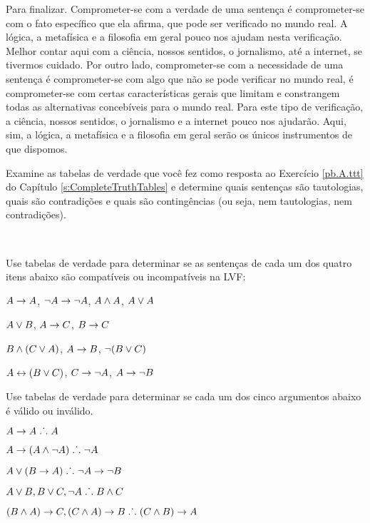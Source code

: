 Para finalizar.
Comprometer-se com a verdade de uma sentença é comprometer-se com o fato específico que ela afirma, que pode ser verificado no mundo real.
A lógica, a metafísica e a filosofia em geral pouco nos ajudam nesta verificação.
Melhor contar aqui com a ciência, nossos sentidos, o jornalismo, até a internet, se tivermos cuidado.
Por outro lado, comprometer-se com a necessidade de uma sentença é comprometer-se com algo que não se pode verificar no mundo real, é comprometer-se com certas características gerais que limitam e constrangem todas as alternativas concebíveis para o mundo real.
Para este tipo de verificação, a ciência, nossos sentidos, o jornalismo e a internet pouco nos ajudarão.
Aqui, sim, a lógica, a metafísica e a filosofia em geral serão os únicos instrumentos de que dispomos.


\practiceproblems
\problempart
Examine as tabelas de verdade que você fez como resposta ao Exercício \ref{pb.A.ttt} do Capítulo \ref{s:CompleteTruthTables} e determine quais sentenças são tautologias, quais são contradições e quais são contingências (ou seja, nem tautologias, nem contradições).
\solutions

\

\problempart
\label{pr.TT.satisfiable}
Use tabelas de verdade para determinar se as sentenças de cada um dos quatro itens abaixo são compatíveis ou incompatíveis na LVF:
\begin{earg}
\item $A\rightarrow A$, $\neg A \rightarrow \neg A$, $A\wedge A$, $A\vee A$ %
\item $A\vee B$, $A\rightarrow C$, $B\rightarrow C$ %
\item $B\wedge(C\vee A)$, $A\rightarrow B$, $\neg(B\vee C)$  %
\item $A\leftrightarrow(B\vee C)$, $C\rightarrow \neg A$, $A\rightarrow \neg B$ %
\end{earg}


\solutions
\problempart
\label{pr.TT.valid}
Use tabelas de verdade para determinar se cada um dos cinco argumentos abaixo é válido ou inválido.
\begin{earg}
\item $A\rightarrow A \mathrel{\ldotp\dot{}\,\ldotp} A$ %
\item $A\rightarrow(A\wedge\neg A) \mathrel{\ldotp\dot{}\,\ldotp} \neg A$ %
\item $A\vee(B\rightarrow A) \mathrel{\ldotp\dot{}\,\ldotp} \neg A \rightarrow \neg B$ %
\item $A\vee B, B\vee C, \neg A \mathrel{\ldotp\dot{}\,\ldotp} B \wedge C$ %
\item $(B\wedge A)\rightarrow C, (C\wedge A)\rightarrow B \mathrel{\ldotp\dot{}\,\ldotp} (C\wedge B)\rightarrow A$ %
\end{earg}

